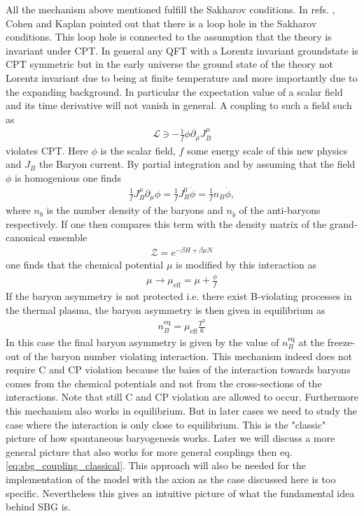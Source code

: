 \documentclass[13pt,a4paper,titlepage]{article}
\begin{document}
All the mechanism above mentioned fulfill the Sakharov conditions.
In refs. \cite{COHEN1987251}, \cite{COHEN1988913} Cohen and Kaplan pointed out that there is a loop hole in the Sakharov conditions.
This loop hole is connected to the assumption that the theory is invariant under CPT.
In general any QFT with a Lorentz invariant groundstate is CPT symmetric but in the early universe the ground state of the theory not Lorentz invariant due to being at finite temperature and more importantly
due to the expanding background. In particular the expectation value of a scalar field and its time derivative will not vanish in general. A coupling to such a field such as \cite[eq. 1.2]{COHEN1987251}
\begin{align}
    \label{eq:sbg_coupling_classical}
    \mathcal{L} \ni - \frac{1}{f} \phi \partial_\mu J^\mu_B
\end{align}
violates CPT. Here $\phi$ is the scalar field, $f$ some energy scale of this new physics and $J_B$ the Baryon current.
By partial integration and by assuming that the field $\phi$ is homogenious one finds \cite[1.3]{COHEN1987251}
\begin{align}
    \frac{1}{f} J_B^\mu \partial_\mu \phi = \frac{1}{f} J_B^0 \dot{\phi}
    = \frac{1}{f} n_B \dot{\phi},
\end{align}
where $n_b$ is the number density of the baryons and $n_{\bar{b}}$ of the anti-baryons respectively.
If one then compares this term with the density matrix of the grand-canonical ensemble
\begin{align}
    \mathcal{Z} = e^{-\beta H + \beta \mu N}
\end{align}
one finds that the chemical potential $\mu$ is modified by this
interaction as
\begin{align}
    \mu \to \mu_\mathrm{eff} = \mu + \frac{\phi}{f}
\end{align}
If the baryon asymmetry is not protected i.e. there exist B-violating processes in the thermal plasma, the baryon asymmetry is then given in equilibrium as \cite[eq. 3.58]{the_early_universe_kolb_and_turner}
\begin{align}
    n_B^\mathrm{eq} = \mu_\mathrm{eff} \frac{T^2}{6}
\end{align}
In this case the final baryon asymmetry is given by the value of $n^\mathrm{eq}_B$ at the freeze-out of the baryon number violating interaction.
This mechanism indeed does not require C and CP violation because the baies of the interaction towards baryons comes from the chemical potentials and not from the cross-sections of the interactions.
Note that still C and CP violation are allowed to occur.
Furthermore this mechanism also works in equilibrium.
But in later cases we need to study the case where the interaction is only close to equilibrium.
This is the "classic" picture of how spontaneous baryogenesis works. Later we will discuss a more general picture
that also works for more general couplings then eq. \eqref{eq:sbg_coupling_classical}.
This approach will also be needed for the implementation of the model with the axion as the case discussed here is too
specific. Nevertheless this gives an intuitive picture of what the fundamental idea behind SBG is.
\end{document}
